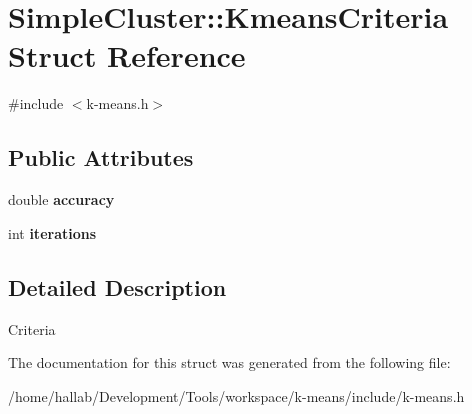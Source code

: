 \hypertarget{structSimpleCluster_1_1KmeansCriteria}{\section{Simple\-Cluster\-:\-:Kmeans\-Criteria Struct Reference}
\label{structSimpleCluster_1_1KmeansCriteria}
}


{\ttfamily \#include $<$k-\/means.\-h$>$}

\subsection*{Public Attributes}
\begin{DoxyCompactItemize}
\item 
\hypertarget{structSimpleCluster_1_1KmeansCriteria_a417746caabd9c8aa94eae201ebe706ff}{double {\bfseries accuracy}}\label{structSimpleCluster_1_1KmeansCriteria_a417746caabd9c8aa94eae201ebe706ff}

\item 
\hypertarget{structSimpleCluster_1_1KmeansCriteria_a315f994501adf69d674ff6ab57291f91}{int {\bfseries iterations}}\label{structSimpleCluster_1_1KmeansCriteria_a315f994501adf69d674ff6ab57291f91}

\end{DoxyCompactItemize}


\subsection{Detailed Description}
Criteria 

The documentation for this struct was generated from the following file\-:\begin{DoxyCompactItemize}
\item 
/home/hallab/\-Development/\-Tools/workspace/k-\/means/include/k-\/means.\-h\end{DoxyCompactItemize}
